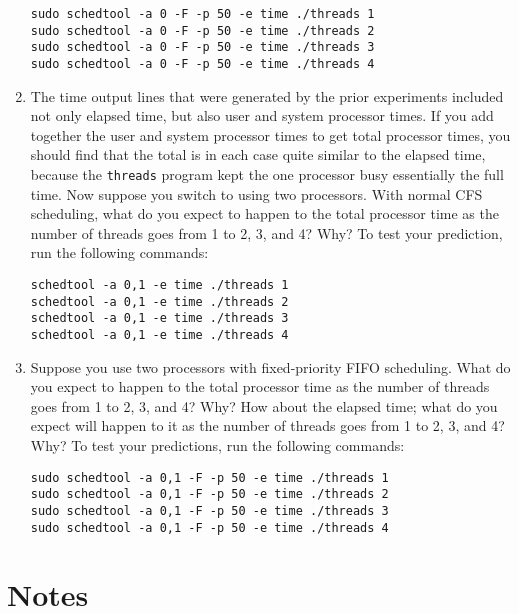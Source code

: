 \begin{chapterEnumerate}
\begin{enumerate}
\begin{verbatim}
sudo schedtool -a 0 -F -p 50 -e time ./threads 1
sudo schedtool -a 0 -F -p 50 -e time ./threads 2
sudo schedtool -a 0 -F -p 50 -e time ./threads 3
sudo schedtool -a 0 -F -p 50 -e time ./threads 4
\end{verbatim}
\item
The time output lines that were generated by the prior experiments included not only elapsed time, but also user and system processor times.  If you add together the user and system processor times to get total processor times, you should find that the total is in each case quite similar to the elapsed time, because the \texttt{threads} program kept the one processor busy essentially the full time.  Now suppose you switch to using two processors.  With normal CFS scheduling, what do you expect to happen to the total processor time as the number of threads goes from 1 to 2, 3, and 4?  Why?  To test your prediction, run the following commands:
\begin{verbatim}
schedtool -a 0,1 -e time ./threads 1
schedtool -a 0,1 -e time ./threads 2
schedtool -a 0,1 -e time ./threads 3
schedtool -a 0,1 -e time ./threads 4
\end{verbatim}
\item
Suppose you use two processors with fixed-priority FIFO scheduling.  What do you expect to happen to the total processor time as the number of threads goes from 1 to 2, 3, and 4?  Why?  How about the elapsed time; what do you expect will happen to it as the number of threads goes from 1 to 2, 3, and 4?  Why?  To test your predictions, run the following commands:
\begin{verbatim}
sudo schedtool -a 0,1 -F -p 50 -e time ./threads 1
sudo schedtool -a 0,1 -F -p 50 -e time ./threads 2
sudo schedtool -a 0,1 -F -p 50 -e time ./threads 3
sudo schedtool -a 0,1 -F -p 50 -e time ./threads 4
\end{verbatim}
\end{enumerate}



\end{chapterEnumerate}

\section*{Notes}

